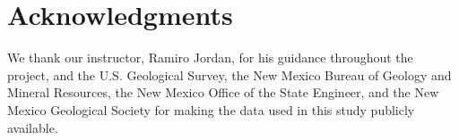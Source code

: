 \documentclass[10pt,twocolumn,letterpaper]{article}
\begin{document}
\section*{Acknowledgments}
We thank our instructor, Ramiro Jordan, for his guidance throughout the project, and the U.S.
Geological Survey, the New Mexico Bureau of Geology and Mineral Resources, the New Mexico Office of
the State Engineer, and the New Mexico Geological Society for making the data used in this study
publicly available.



\end{document}
